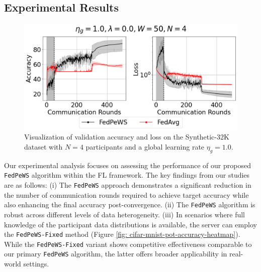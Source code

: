 \documentclass{article}
\begin{document}
\subsection{Experimental Results}
\label{subsection: exp-results}


\begin{figure}
    \vspace{-2em}
    \centering
    \includegraphics[width=\linewidth]{images/synth-n4-acc-loss-suptitle-v2.pdf}
    \caption{Visualization of validation accuracy and loss on the Synthetic-32K dataset with $N=4$ participants and a global learning rate $\eta_g=1.0$.} 
    \label{fig: n4-synthetic}
    \vspace{-1.0em}
\end{figure} 

Our experimental analysis focuses on assessing the performance of our proposed \texttt{FedPeWS} algorithm within the FL framework. The key findings from our studies are as follows: (i) The \texttt{FedPeWS} approach demonstrates a significant reduction in the number of communication rounds required to achieve target accuracy while also enhancing the final accuracy post-convergence. (ii) The \texttt{FedPeWS} algorithm is robust across different levels of data heterogeneity. (iii) In scenarios where full knowledge of the participant data distributions is available, the server can employ the \texttt{FedPeWS-Fixed} method (Figure \ref{fig: cifar-mnist-pot-accuracy-heatmap}). While the \texttt{FedPeWS-Fixed} variant shows competitive effectiveness comparable to our primary \texttt{FedPeWS} algorithm, the latter offers broader applicability in real-world settings.
\end{document}
